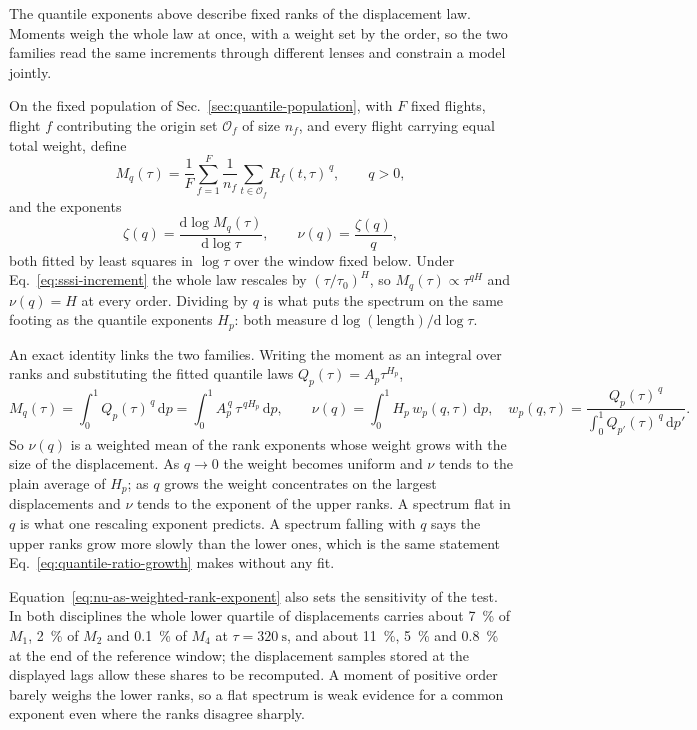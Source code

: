 The quantile exponents above describe fixed ranks of the displacement law. Moments
weigh the whole law at once, with a weight set by the order, so the two families read
the same increments through different lenses and constrain a model jointly.

On the fixed population of Sec.~\ref{sec:quantile-population}, with $F$ fixed flights,
flight $f$ contributing the origin set $\mathcal O_f$ of size $n_f$, and every flight
carrying equal total weight, define
\begin{equation}
  M_q(\tau)=\frac1F\sum_{f=1}^{F}\frac{1}{n_f}
            \sum_{t\in\mathcal O_f}R_f(t,\tau)^{\,q},
  \qquad q>0,
  \label{eq:equal-flight-moment}
\end{equation}
and the exponents
\begin{equation}
  \zeta(q)=\frac{\mathrm d\log M_q(\tau)}{\mathrm d\log\tau},
  \qquad
  \nu(q)=\frac{\zeta(q)}{q},
  \label{eq:moment-exponents}
\end{equation}
both fitted by least squares in $\log\tau$ over the window fixed below.
Under Eq.~\eqref{eq:sssi-increment} the whole law rescales by $(\tau/\tau_0)^H$, so
$M_q(\tau)\propto\tau^{qH}$ and $\nu(q)=H$ at every order. Dividing by $q$ is what puts
the spectrum on the same footing as the quantile exponents $H_p$: both measure
$\mathrm d\log(\text{length})/\mathrm d\log\tau$.

An exact identity links the two families. Writing the moment as an integral over ranks and
substituting the fitted quantile laws $Q_p(\tau)=A_p\tau^{H_p}$,
\begin{equation}
  M_q(\tau)=\int_0^1 Q_p(\tau)^{\,q}\,\mathrm dp
           =\int_0^1 A_p^{\,q}\,\tau^{\,qH_p}\,\mathrm dp,
  \qquad
  \nu(q)=\int_0^1 H_p\,w_p(q,\tau)\,\mathrm dp,
  \quad
  w_p(q,\tau)=\frac{Q_p(\tau)^{\,q}}{\int_0^1 Q_{p'}(\tau)^{\,q}\,\mathrm dp'}.
  \label{eq:nu-as-weighted-rank-exponent}
\end{equation}
So $\nu(q)$ is a weighted mean of the rank exponents whose weight grows with the size
of the displacement. As $q\to0$ the weight becomes uniform and $\nu$ tends to the plain
average of $H_p$; as $q$ grows the weight concentrates on the largest displacements and
$\nu$ tends to the exponent of the upper ranks. A spectrum flat in $q$ is what one
rescaling exponent predicts. A spectrum falling with $q$ says the upper ranks grow more
slowly than the lower ones, which is the same statement
Eq.~\eqref{eq:quantile-ratio-growth} makes without any fit.

Equation~\eqref{eq:nu-as-weighted-rank-exponent} also sets the sensitivity of the test.
In both disciplines the whole lower quartile of displacements carries about
\SI{7}{\percent} of $M_1$, \SI{2}{\percent} of $M_2$ and \SI{0.1}{\percent} of $M_4$ at
$\tau=\SI{320}{\second}$, and about \SI{11}{\percent}, \SI{5}{\percent} and
\SI{0.8}{\percent} at the end of the reference window; the displacement samples stored
at the displayed lags allow these shares to be recomputed. A moment of positive order
barely weighs the lower ranks, so a flat spectrum is weak evidence for a common
exponent even where the ranks disagree sharply.

